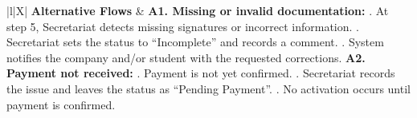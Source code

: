 \begin{xltabular}{\textwidth}{|l|X|}
    \textbf{Alternative Flows} &
        \textbf{A1. Missing or invalid documentation:} . At step 5, Secretariat detects missing signatures or incorrect information. . Secretariat sets the status to “Incomplete” and records a comment. . System notifies the company and/or student with the requested corrections. \newline
        \textbf{A2. Payment not received:} . Payment is not yet confirmed. . Secretariat records the issue and leaves the status as “Pending Payment”. . No activation occurs until payment is confirmed. \\ \hline
\end{xltabular}

